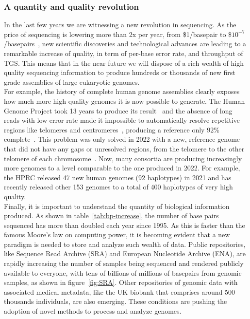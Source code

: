 \subsubsection{A quantity and quality revolution }
In the last few years we are witnessing a new revolution in sequencing. As the price of sequencing is lowering more than 2x per year, from \$1/basepair to \$$10^{-7}$/basepairs~\cite{durbin_recomb}, new scientific discoveries and technological advances are leading to a remarkable increase of quality, in term of per-base error rate, and throughput of TGS. This means that in the near future we will dispose of a rich wealth of high quality sequencing information to produce hundreds or thousands of new first grade assemblies of large eukaryotic genomes.\\
For example, the history of complete human genome assemblies clearly exposes how much more high quality genomes it is now possible to generate. The Human Genome Project took 13 years to produce its result~\cite{humangenomeproject} and the absence of long reads with low error rate made it impossible to automatically resolve repetitive regions like telomeres and centromeres~\cite{human-pangenomics-era}, producing a reference only $92\%$ complete~\cite{t2t}. This problem was only solved in 2022 with a new, reference genome that did not have any gaps or unresolved regions, from the telomere to the other telomere of each chromosome~\cite{t2t}. Now, many consortia are producing increasingly more genomes to a level comparable to the one produced in 2022. For example, the HPRC released 47 new human genomes (92 haplotypes) in 2021 and has recently released other 153 genomes to a total of 400 haplotypes of very high quality.\\
Finally, it is important to understand the quantity of biological information produced. As shown in table~\ref{tab:bp-increase}, the number of base pairs sequenced has more than doubled each year since 1995. As this is faster than the famous Moore's law on computing power, it is becoming evident that a new paradigm is needed to store and analyze such wealth of data. Public repositories, like Sequence Read Archive (\gls{SRA}) and European Nucleotide Archive (\gls{ENA}), are rapidly increasing the number of samples being sequenced and rendered publicly available to everyone, with tens of billions of millions of basepairs from genomic samples, as shown in figure~\ref{fig:SRA}. Other repositories of genomic data with associated medical metadata, like the UK biobank that comprises around 500 thousands individuals, are also emerging. These conditions are pushing the adoption of novel methods to process and analyze genomes.


